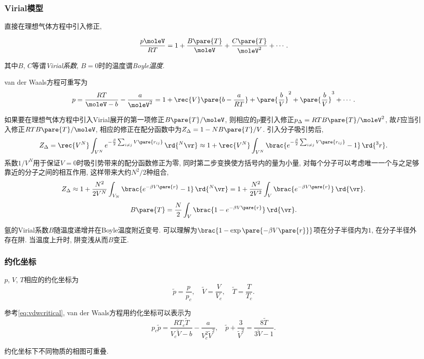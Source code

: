 \documentclass[../Thermal.tex]{subfiles}
\begin{document}
\subsubsection{Virial模型}
直接在理想气体方程中引入修正,
\begin{finale}
\begin{axiom}[Onnes方程]
\[ \frac{p\moleV}{RT} = 1 + \frac{B\pare{T}}{\moleV} + \frac{C\pare{T}}{\moleV^2} + \cdots. \]
\end{axiom}
\end{finale}
其中$B$, $C$等谓\emph{Virial系数}, $B=0$时的温度谓\emph{Boyle温度}.
\begin{ex}
van der Waals方程可重写为
\[ p = \frac{RT}{\moleV - b} - \frac{a}{\moleV^2} = 1 + \rec{V}\pare{b - \frac{a}{RT}} + \pare{\frac{b}{V}}^2 + \pare{\frac{b}{V}}^3 + \cdots. \]
\end{ex}
如果要在理想气体方程中引入Virial展开的第一项修正$B\pare{T}/\moleV$, 则相应的$p$要引入修正$p_\Delta = RTB\pare{T}/\moleV^2$, 故$F$应当引入修正$RTB\pare{T}/\moleV$, 相应的修正在配分函数中为$Z_\Delta = 1-NB\pare{T}/V$. 引入分子吸引势后,
\[ Z_\Delta = \rec{V^N}\int_{V^N} e^{-\frac{\beta}{2}\sum_{i\neq j}V\pare{r_{ij}}}\,\rd{^N\vr} \approx 1 + \rec{V^N}\int_{V^N} \brac{e^{-\frac{\beta}{2}\sum_{i\neq j}V\pare{r_{ij}}} - 1}\,\rd{^3r}. \]
系数$1/V^N$用于保证$V=0$时吸引势带来的配分函数修正为零, 同时第二步变换使方括号内的量为小量, 对每个分子可以考虑唯一一个与之足够靠近的分子之间的相互作用, 这样带来大约$N^2/2$种组合,
\[ Z_\Delta \approx 1 + \frac{N^2}{2V^N}\int_{V_N} \brac{e^{-\beta V\pare{r}} - 1}\,\rd{^N\vr} = 1 + \frac{N^2}{2V^2}\int_V \brac{e^{-\beta V\pare{r}}}\,\rd{\vr}. \]
\[ B\pare{T} = \frac{N}{2}\int_V\brac{1-e^{-\beta V\pare{r}}}\,\rd{\vr}. \]
\begin{ex}
氩的Virial系数$B$随温度递增并在Boyle温度附近变号. 可以理解为$\brac{1-\exp\pare{-\beta V\pare{r}}}$项在分子半径内为$1$, 在分子半径外存在阱. 当温度上升时, 阱变浅从而$B$变正.
\end{ex}
\subsubsection{约化坐标}
\begin{definition}[约化坐标]
$p$, $V$, $T$相应的约化坐标为
\[ \tilde{p} = \frac{p}{p_c},\quad \tilde{V} = \frac{V}{V_c},\quad \tilde{T} = \frac{T}{T_c}. \]
\end{definition}
\begin{ex}
参考\eqref{eq:vdwcritical}, van der Waals方程用约化坐标可以表示为
\[ p_c\tilde{p} = \frac{RT_c\tilde{T}}{V_c\tilde{V} - b} - \frac{a}{V_c^2\tilde{V}^2},\quad \tilde{p} + \frac{3}{\tilde{V}^2} = \frac{8\tilde{T}}{3\tilde{V} - 1}. \]
\end{ex}
\begin{theorem}[对应态定律]
约化坐标下不同物质的相图可重叠.
\end{theorem}
\end{document}
